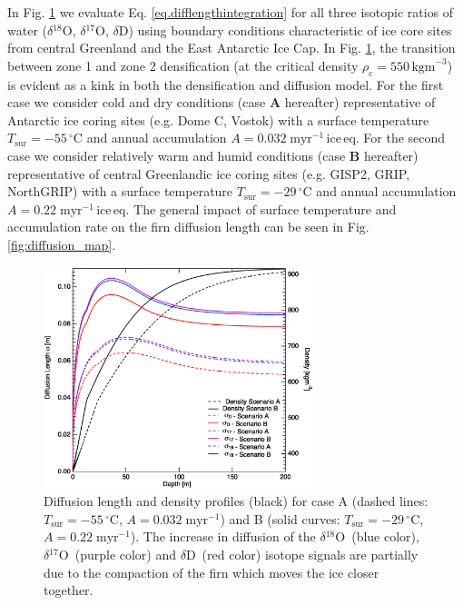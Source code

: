 \documentclass[11pt, draftcls, onecolumn]{IEEEtran} %
\numberwithin{equation}{section}
\numberwithin{table}{section}
\numberwithin{figure}{section}
\newcommand{\delOx}{$\delta{}^{18}\mathrm{O}$}
\newcommand{\delOxb}{$\delta{}^{17}\mathrm{O}$}
\newcommand{\delD}{$\delta\mathrm{D}$}
\begin{document}
In Fig. \ref{fig:diffusion_length_profiles} we evaluate Eq. \ref{eq.difflengthintegration} for all three isotopic ratios 
of water (\delOx, \delOxb, \delD) using boundary conditions characteristic of ice core sites from central Greenland
and the East Antarctic Ice Cap.
In Fig. \ref{fig:diffusion_length_profiles},
the transition between zone 1 and zone 2 densification (at the critical density $\rho_\mathrm{c} = 550\, \mathrm{kg m}^{-3}$) is 
evident as a kink in both the densification and diffusion model.
For the first case we consider cold and dry conditions (case \textbf{A} hereafter)
representative of Antarctic ice coring sites
(e.g. Dome C, Vostok) with a surface temperature $T_{\mathrm{sur}} = -55 \,^{\circ} \mathrm{C}$ and 
annual accumulation $A = 0.032 \;\mathrm{myr^{-1}\, ice\, eq.}$
For the second case we consider relatively warm and humid conditions (case \textbf{B} hereafter)
representative of central Greenlandic ice coring sites
(e.g. GISP2, GRIP, NorthGRIP) with a surface temperature $T_{\mathrm{sur}} = -29 \,^{\circ} \mathrm{C}$ and 
annual accumulation $A = 0.22 \;\mathrm{myr^{-1}\, ice\, eq.}$
The general impact of surface temperature and accumulation rate on the firn diffusion length can be seen in Fig. \ref{fig:diffusion_map}.


\begin{figure}[]	
\vspace*{2mm}
	\begin{center}
			\includegraphics[width=0.7\textwidth]{Figure_1}
			\caption{Diffusion length and density profiles (black) for case A (dashed lines: $T_{\mathrm{sur}} = -55 \,^{\circ} \mathrm{C}$,
				$A = 0.032 \;\mathrm{myr^{-1}}$) and B (solid curves: $T_{\mathrm{sur}} = -29 \,^{\circ} \mathrm{C}$,
				$A = 0.22 \;\mathrm{myr^{-1}}$). 
				The increase in diffusion of the \delOx~(blue color), \delOxb~(purple color) and \delD~(red color) isotope signals are
				partially due to the compaction of the firn which moves the ice closer together. } 		
	\label{fig:diffusion_length_profiles}		
		\end{center}

\end{figure}
\end{document}
